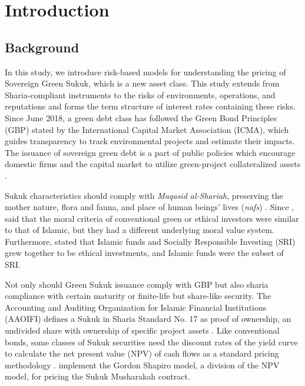 \documentclass[sn-basic]{sn-jnl}%
\theoremstyle{thmstyleone}%
\theoremstyle{thmstyletwo}%
\theoremstyle{thmstylethree}%
\begin{document}
\section{Introduction}
\label{Introduction}
\subsection{Background}
In this study, we introduce risk-based models for understanding the pricing of Sovereign Green Sukuk, which is a new asset class. This study extends from Sharia-compliant instruments to the risks of environments, operations, and reputations and forms the term structure of interest rates containing these risks. Since June 2018, a green debt class has followed the Green Bond Principles (GBP) stated by the International Capital Market Association (ICMA), which guides transparency to track environmental projects and estimate their impacts. The issuance of sovereign green debt is a part of public policies which encourage domestic firms and the capital market to utilize green-project collateralized assets \citep{monasterolo2018eirin}.

Sukuk characteristics should comply with \emph{Maqasid al-Shariah}, preserving the mother nature, flora and fauna, and place of human beings' lives (\emph{nafs}) \citep{khouildi2018innovative}. Since \citeyear{wilson1997islamic}, \citeauthor{wilson1997islamic} said that the moral criteria of conventional green or ethical investors were similar to that of Islamic, but they had a different underlying moral value system. Furthermore, \citet{charfeddine2016socially} stated that Islamic funds and Socially Responsible Investing (SRI) grew together to be ethical investments, and Islamic funds were the subset of SRI.

Not only should Green Sukuk issuance comply with GBP but also sharia compliance with certain maturity or finite-life but share-like security. The Accounting and Auditing Organization for Islamic Financial Institutions (AAOIFI) defines a Sukuk in Sharia Standard No. 17 as proof of ownership, an undivided share with ownership of specific project assets \citep{hanefah2013sukuk}. Like conventional bonds, some classes of Sukuk securities need the discount rates of the yield curve to calculate the net present value (NPV) of cash flows as a standard pricing methodology \citep{razak2019contracts}. \citet{ahroum2017pricing} implement the Gordon Shapiro model, a division of the NPV model, for pricing the Sukuk Musharakah contract. 
\end{document}
